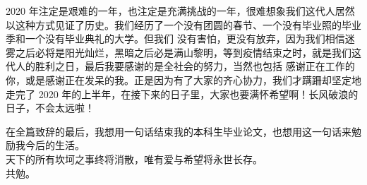 2020 年注定是艰难的一年，也注定是充满挑战的一年，很难想象我们这代人居然以这种方式见证了历史。我们经历了一个没有团圆的春节、一个没有毕业照的毕业季和一个没有毕业典礼的大学。但我们
没有害怕，更没有放弃，因为我们相信迷雾之后必将是阳光灿烂，黑暗之后必是满山黎明，等到疫情结束之时，就是我们这代人的胜利之日，最后我要感谢的是全社会的努力，当然也包括
感谢正在工作的你，或是感谢正在发呆的我。正是因为有了大家的齐心协力，我们才蹒跚却坚定地走完了 2020 年的上半年，在接下来的日子里，大家也要满怀希望啊！长风破浪的日子，不会太远啦！

在全篇致辞的最后，我想用一句话结束我的本科生毕业论文，也想用这一句话来勉励我今后的生活。\\

天下的所有坎坷之事终将消散，唯有爱与希望将永世长存。\\

共勉。

